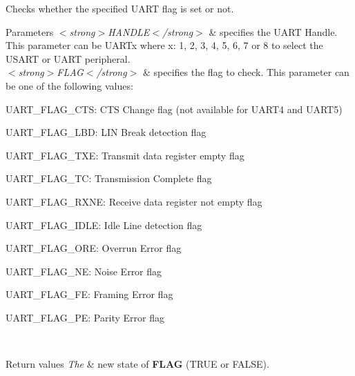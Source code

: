 Checks whether the specified U\+A\+RT flag is set or not. 


\begin{DoxyParams}{Parameters}
{\em $<$strong$>$\+H\+A\+N\+D\+L\+E$<$/strong$>$} & specifies the U\+A\+RT Handle. This parameter can be U\+A\+R\+Tx where x\+: 1, 2, 3, 4, 5, 6, 7 or 8 to select the U\+S\+A\+RT or U\+A\+RT peripheral. \\
\hline
{\em $<$strong$>$\+F\+L\+A\+G$<$/strong$>$} & specifies the flag to check. This parameter can be one of the following values\+: \begin{DoxyItemize}
\item U\+A\+R\+T\+\_\+\+F\+L\+A\+G\+\_\+\+C\+TS\+: C\+TS Change flag (not available for U\+A\+R\+T4 and U\+A\+R\+T5) \item U\+A\+R\+T\+\_\+\+F\+L\+A\+G\+\_\+\+L\+BD\+: L\+IN Break detection flag \item U\+A\+R\+T\+\_\+\+F\+L\+A\+G\+\_\+\+T\+XE\+: Transmit data register empty flag \item U\+A\+R\+T\+\_\+\+F\+L\+A\+G\+\_\+\+TC\+: Transmission Complete flag \item U\+A\+R\+T\+\_\+\+F\+L\+A\+G\+\_\+\+R\+X\+NE\+: Receive data register not empty flag \item U\+A\+R\+T\+\_\+\+F\+L\+A\+G\+\_\+\+I\+D\+LE\+: Idle Line detection flag \item U\+A\+R\+T\+\_\+\+F\+L\+A\+G\+\_\+\+O\+RE\+: Overrun Error flag \item U\+A\+R\+T\+\_\+\+F\+L\+A\+G\+\_\+\+NE\+: Noise Error flag \item U\+A\+R\+T\+\_\+\+F\+L\+A\+G\+\_\+\+FE\+: Framing Error flag \item U\+A\+R\+T\+\_\+\+F\+L\+A\+G\+\_\+\+PE\+: Parity Error flag \end{DoxyItemize}
\\
\hline
\end{DoxyParams}

\begin{DoxyRetVals}{Return values}
{\em The} & new state of {\bfseries F\+L\+AG} (T\+R\+UE or F\+A\+L\+SE). \\
\hline
\end{DoxyRetVals}
